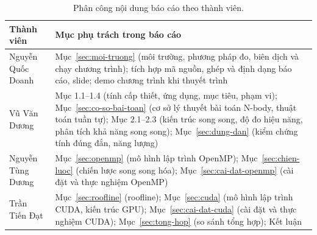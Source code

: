 \begin{table}[H]
\centering\small
\begin{tabular}{p{3.6cm}p{11cm}}
\toprule
\textbf{Thành viên} & \textbf{Mục phụ trách trong báo cáo} \\
\midrule
Nguyễn Quốc Doanh & Mục~\ref{sec:moi-truong} (môi trường, phương pháp đo, biên dịch và chạy chương trình); tích hợp mã nguồn, ghép và định dạng báo cáo, slide; demo chương trình khi thuyết trình \\
Vũ Văn Dương & Mục 1.1--1.4 (tính cấp thiết, ứng dụng, mục tiêu, phạm vi); Mục~\ref{sec:co-so-bai-toan} (cơ sở lý thuyết bài toán N-body, thuật toán tuần tự); Mục 2.1--2.3 (kiến trúc song song, độ đo hiệu năng, phân tích khả năng song song); Mục~\ref{sec:dung-dan} (kiểm chứng tính đúng đắn, năng lượng) \\
Nguyễn Tùng Dương & Mục~\ref{sec:openmp} (mô hình lập trình OpenMP); Mục~\ref{sec:chien-luoc} (chiến lược song song hóa); Mục~\ref{sec:cai-dat-openmp} (cài đặt và thực nghiệm OpenMP) \\
Trần Tiến Đạt & Mục~\ref{sec:roofline} (roofline); Mục~\ref{sec:cuda} (mô hình lập trình CUDA, kiến trúc GPU); Mục~\ref{sec:cai-dat-cuda} (cài đặt và thực nghiệm CUDA); Mục~\ref{sec:tong-hop} (so sánh tổng hợp); Kết luận \\
\bottomrule
\end{tabular}
\caption{Phân công nội dung báo cáo theo thành viên.}
\label{tab:phan-cong}
\end{table}
